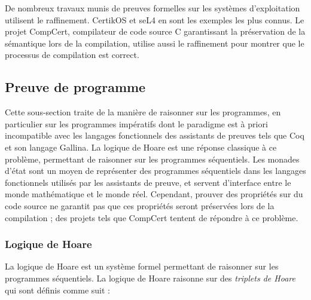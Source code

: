 			De nombreux travaux munis de preuves formelles sur les systèmes d'exploitation utilisent le raffinement. CertikOS et seL4 en sont les exemples les plus connus. Le projet CompCert, compilateur de code source C garantissant la préservation de la sémantique lors de la compilation, utilise aussi le raffinement pour montrer que le processus de compilation est correct.

		\subsection{Preuve de programme}

			Cette sous-section traite de la manière de raisonner sur les programmes, en particulier sur les programmes impératifs dont le paradigme est à priori incompatible avec les langages fonctionnels des assistants de preuves tels que Coq et son langage Gallina. La logique de Hoare est une réponse classique à ce problème, permettant de raisonner sur les programmes séquentiels. Les monades d'état sont un moyen de représenter des programmes séquentiels dans les langages fonctionnels utilisés par les assistants de preuve, et servent d'interface entre le monde mathématique et le monde réel. Cependant, prouver des propriétés sur du code source ne garantit pas que ces propriétés seront préservées lors de la compilation ; des projets tels que CompCert tentent de répondre à ce problème. 

			\subsubsection{Logique de Hoare}

			La logique de Hoare est un système formel permettant de raisonner sur les programmes séquentiels.
			La logique de Hoare raisonne sur des \emph{triplets de Hoare} qui sont définis comme suit :
			
